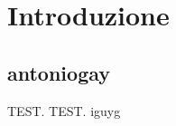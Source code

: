 \chapter{Introduzione}
\label{chap:introduction}
\section{antoniogay}
\label{sect:gay}
TEST.
TEST.
iguyg
